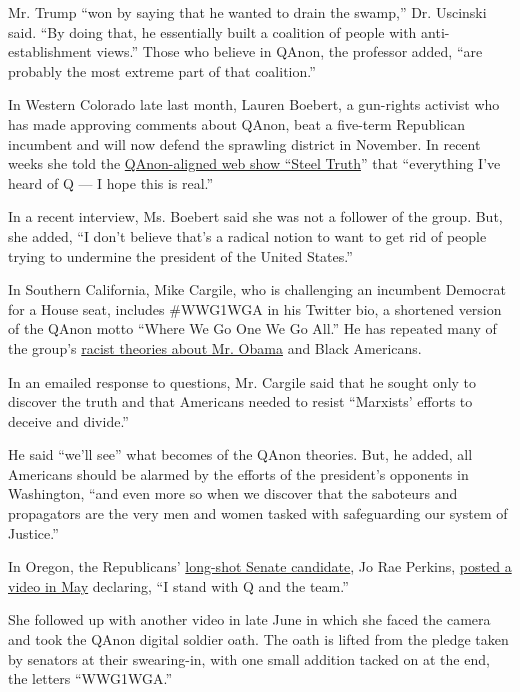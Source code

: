 Mr. Trump ``won by saying that he wanted to drain the swamp,'' Dr.
Uscinski said. ``By doing that, he essentially built a coalition of
people with anti-establishment views.'' Those who believe in QAnon, the
professor added, ``are probably the most extreme part of that
coalition.''

In Western Colorado late last month, Lauren Boebert, a gun-rights
activist who has made approving comments about QAnon, beat a five-term
Republican incumbent and will now defend the sprawling district in
November. In recent weeks she told the
\href{https://www.washingtonpost.com/politics/gun-rights-activist-defeats-five-term-gop-congressman-in-colorado-primary/2020/06/30/2ffb8736-bb3d-11ea-80b9-40ece9a701dc_story.html?itid=lk_inline_manual_8}{QAnon-aligned
web show ``Steel Truth}'' that ``everything I've heard of Q --- I hope
this is real.''

In a recent interview, Ms. Boebert said she was not a follower of the
group. But, she added, ``I don't believe that's a radical notion to want
to get rid of people trying to undermine the president of the United
States.''

In Southern California, Mike Cargile, who is challenging an incumbent
Democrat for a House seat, includes \#WWG1WGA in his Twitter bio, a
shortened version of the QAnon motto ``Where We Go One We Go All.'' He
has repeated many of the group's
\href{https://www.lamag.com/citythinkblog/mike-cargile-qanon/}{racist
theories about Mr. Obama} and Black Americans.

In an emailed response to questions, Mr. Cargile said that he sought
only to discover the truth and that Americans needed to resist
``Marxists' efforts to deceive and divide.''

He said ``we'll see'' what becomes of the QAnon theories. But, he added,
all Americans should be alarmed by the efforts of the president's
opponents in Washington, ``and even more so when we discover that the
saboteurs and propagators are the very men and women tasked with
safeguarding our system of Justice.''

In Oregon, the Republicans'
\href{https://www.nytimes.com/2020/05/20/us/oregon-senate-perkins-qanon.html}{long-shot
Senate candidate}, Jo Rae Perkins,
\href{https://www.opb.org/news/article/jo-rae-perkins-qanon-oregon-republican-senate-nominee/}{posted
a video in May} declaring, ``I stand with Q and the team.''

She followed up with another video in late June in which she faced the
camera and took the QAnon digital soldier oath. The oath is lifted from
the pledge taken by senators at their swearing-in, with one small
addition tacked on at the end, the letters ``WWG1WGA.''

